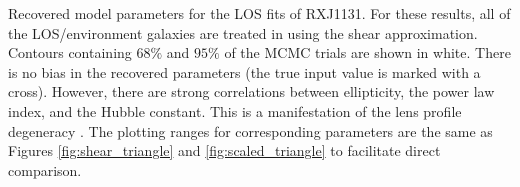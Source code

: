 \label{fig:los_triangle} Recovered model parameters for the LOS fits of RXJ1131. For these results, all of the LOS/environment galaxies are treated in using the shear approximation. Contours containing $68\%$ and $95\%$ of the MCMC trials are shown in white. There is no bias in the recovered parameters (the true input value is marked with a cross). However, there are strong correlations between ellipticity, the power law index, and the Hubble constant. This is a manifestation of the lens profile degeneracy \citep{Kochanek02}. The plotting ranges for corresponding parameters are the same as Figures \ref{fig:shear_triangle} and \ref{fig:scaled_triangle} to facilitate direct comparison.